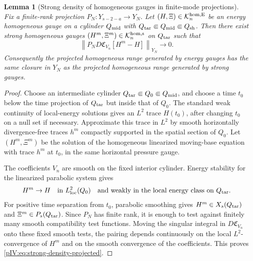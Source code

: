 \documentclass[11pt]{article}
\numberwithin{equation}{section}
\theoremstyle{plain}
\newtheorem{lemma}{Lemma}[section]
\theoremstyle{definition}
\theoremstyle{remark}
\newcommand{\calC}{\mathfrak C}
\newcommand{\calK}{\mathcal K}
\begin{document}
\begin{lemma}[Strong density of homogeneous gauges in finite-mode projections]
\label{pIV:lem:strong-hom-gauge-density}
Fix a finite-rank projection \(P_N:Y_{s-2-a}\to Y_N\).  Let
\((H,\Xi)\in \calK^{\rm hom,E}_n\) be an energy homogeneous gauge on a cylinder
\(Q_{\rm mid}\) with \(Q_{\rm tar}\Subset Q_{\rm mid}\Subset Q_{\rm sh}\).  Then there
exist strong homogeneous gauges
\((H^m,\Xi^m)\in \calK^{\rm hom,s}_n\) on \(Q_{\rm tar}\) such that
\begin{equation}\label{pIV:eq:strong-density-projected}
        \left\|
        P_ND\calC_{V_n}[H^m-H]
        \right\|_{Y_N}
        \longrightarrow 0 .
\end{equation}
Consequently the projected homogeneous range generated by energy gauges has the same
closure in \(Y_N\) as the projected homogeneous range generated by strong gauges.
\end{lemma}

\begin{proof}
Choose an intermediate cylinder
\(Q_{\rm tar}\Subset Q_0\Subset Q_{\rm mid}\), and choose a time
\(t_0\) below the time projection of \(Q_{\rm tar}\) but inside that of \(Q_0\).  The
standard weak continuity of local-energy solutions gives an \(L^2\) trace
\(H(t_0)\), after changing \(t_0\) on a null set if necessary.  Approximate this trace
in \(L^2\) by smooth horizontally divergence-free traces \(h^m\) compactly supported in
the spatial section of \(Q_0\).  Let \((H^m,\Xi^m)\) be the solution of the homogeneous
linearized moving-base equation with trace \(h^m\) at \(t_0\), in the same horizontal
pressure gauge.

The coefficients \(V_n\) are smooth on the fixed interior cylinder.  Energy stability
for the linearized parabolic system gives
\[
        H^m\to H
        \quad\text{in }L^2_{\rm loc}(Q_0)
        \quad\text{and weakly in the local energy class on }Q_{\rm tar}.
\]
For positive time separation from \(t_0\), parabolic smoothing gives
\(H^m\in X_s(Q_{\rm tar})\) and \(\Xi^m\in P_s(Q_{\rm tar})\).  Since \(P_N\) has finite
rank, it is enough to test against finitely many smooth compatibility test functions.
Moving the singular integral in \(D\calC_{V_n}\) onto these fixed smooth tests, the
pairing depends continuously on the local \(L^2\)-convergence of \(H^m\) and on the
smooth convergence of the coefficients.  This proves \eqref{pIV:eq:strong-density-projected}.
\end{proof}
\end{document}
